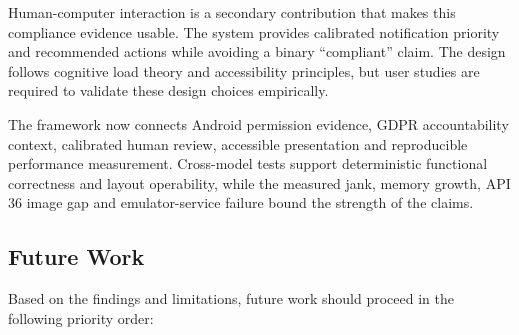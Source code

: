 Human-computer interaction is a secondary contribution that makes this compliance evidence usable. The system provides calibrated notification priority and recommended actions while avoiding a binary ``compliant'' claim. The design follows cognitive load theory and accessibility principles, but user studies are required to validate these design choices empirically.

The framework now connects Android permission evidence, GDPR accountability context, calibrated human review, accessible presentation and reproducible performance measurement. Cross-model tests support deterministic functional correctness and layout operability, while the measured jank, memory growth, API 36 image gap and emulator-service failure bound the strength of the claims.

\subsection{Future Work}

Based on the findings and limitations, future work should proceed in the following priority order:

